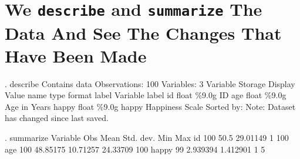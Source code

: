 \documentclass[
]{article}
\begin{document}
\section{\texorpdfstring{We \texttt{describe} and \texttt{summarize} The
Data And See The Changes That Have Been
Made}{We describe and summarize The Data And See The Changes That Have Been Made}}\label{we-describe-and-summarize-the-data-and-see-the-changes-that-have-been-made}

\begin{stlog}
. describe
{\smallskip}
Contains data
 Observations:           100                  
    Variables:             3                  
Variable      Storage   Display    Value
    name         type    format    label      Variable label
id              float   \%9.0g                 ID
age             float   \%9.0g                 Age in Years
happy           float   \%9.0g      happy      Happiness Scale
Sorted by: 
     Note: Dataset has changed since last saved.
\end{stlog}

\begin{stlog}
. summarize
{\smallskip}
    Variable {\VBAR}        Obs        Mean    Std. dev.       Min        Max
          id {\VBAR}        100        50.5    29.01149          1        100
         age {\VBAR}        100    48.85175    10.71257   24.33709        100
       happy {\VBAR}         99    2.939394    1.412901          1          5
\end{stlog}
\end{document}
